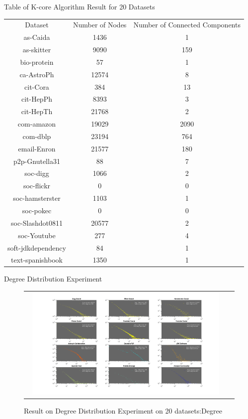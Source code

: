 \begin{center}
Table of K-core Algorithm Result for 20 Datasets
\begin{tabular}{ |c|c|c| }
 \hline
 Dataset & Number of Nodes & Number of Connected Components \\
  as-Caida & 1436 & 1 \\
  as-skitter & 9090 & 159 \\
  bio-protein & 57 & 1 \\
  ca-AstroPh & 12574 & 8 \\
  cit-Cora & 384 & 13 \\
  cit-HepPh & 8393 & 3 \\
  cit-HepTh & 21768 & 2 \\
  com-amazon & 19029 & 2090 \\
  com-dblp & 23194 & 764 \\
  email-Enron & 21577 & 180 \\
  p2p-Gnutella31 & 88 & 7 \\
  soc-digg & 1066 & 2 \\
  soc-flickr & 0 & 0 \\
  soc-hamsterster & 1103 & 1 \\
  soc-pokec & 0 & 0 \\
  soc-Slashdot0811 & 20577 & 2 \\
  soc-Youtube & 277 & 4 \\
  soft-jdkdependency & 84 & 1 \\
  text-spanishbook & 1350 & 1 \\
 \hline
\end{tabular}
\end{center}


Degree Distribution Experiment
\begin{figure}[H]
\begin{center}
\begin{tabular}{cc}
     \includegraphics[width=0.95\textwidth]{FIG/degree1.png}
\end{tabular}
\caption{Result on Degree Distribution Experiment on 20 datasets:Degree}
\end{center}
\end{figure}

